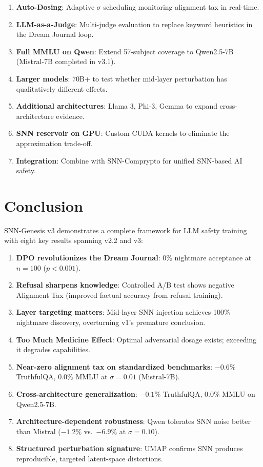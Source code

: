 \documentclass[11pt,a4paper]{article}
\begin{document}
\begin{enumerate}
    \item \textbf{Auto-Dosing}: Adaptive $\sigma$ scheduling monitoring alignment tax in real-time.
    \item \textbf{LLM-as-a-Judge}: Multi-judge evaluation to replace keyword heuristics in the Dream Journal loop.
    \item \textbf{Full MMLU on Qwen}: Extend 57-subject coverage to Qwen2.5-7B (Mistral-7B completed in v3.1).
    \item \textbf{Larger models}: 70B+ to test whether mid-layer perturbation has qualitatively different effects.
    \item \textbf{Additional architectures}: Llama 3, Phi-3, Gemma to expand cross-architecture evidence.
    \item \textbf{SNN reservoir on GPU}: Custom CUDA kernels to eliminate the approximation trade-off.
    \item \textbf{Integration}: Combine with SNN-Comprypto \cite{funasaki2026comprypto} for unified SNN-based AI safety.
\end{enumerate}

\section{Conclusion}

SNN-Genesis v3 demonstrates a complete framework for LLM safety training with eight key results spanning v2.2 and v3:

\begin{enumerate}
    \item \textbf{DPO revolutionizes the Dream Journal}: 0\% nightmare acceptance at $n=100$ ($p < 0.001$).
    \item \textbf{Refusal sharpens knowledge}: Controlled A/B test shows negative Alignment Tax (improved factual accuracy from refusal training).
    \item \textbf{Layer targeting matters}: Mid-layer SNN injection achieves 100\% nightmare discovery, overturning v1's premature conclusion.
    \item \textbf{Too Much Medicine Effect}: Optimal adversarial dosage exists; exceeding it degrades capabilities.
    \item \textbf{Near-zero alignment tax on standardized benchmarks}: $-0.6\%$ TruthfulQA, $0.0\%$ MMLU at $\sigma=0.01$ (Mistral-7B).
    \item \textbf{Cross-architecture generalization}: $-0.1\%$ TruthfulQA, $0.0\%$ MMLU on Qwen2.5-7B.
    \item \textbf{Architecture-dependent robustness}: Qwen tolerates SNN noise better than Mistral ($-1.2\%$ vs.\ $-6.9\%$ at $\sigma=0.10$).
    \item \textbf{Structured perturbation signature}: UMAP confirms SNN produces reproducible, targeted latent-space distortions.
\end{enumerate}
\end{document}
